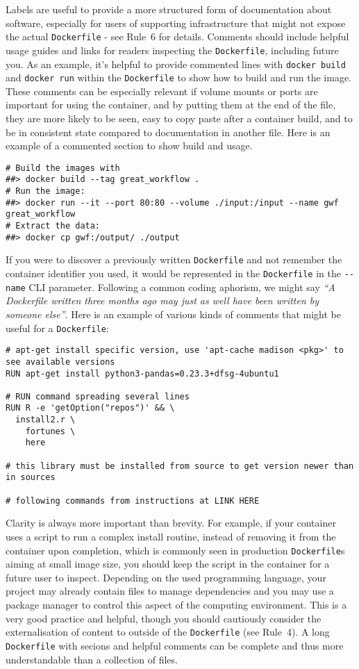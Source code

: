\documentclass[10pt,letterpaper]{article}
\begin{document}
Labels are useful to provide a more structured form of documentation
about software, especially for users of supporting infrastructure that
might not expose the actual \texttt{Dockerfile} - see Rule~6 for
details. Comments should include helpful usage guides and links for
readers inspecting the \texttt{Dockerfile}, including future you. As an
example, it's helpful to provide commented lines with
\texttt{docker\ build} and \texttt{docker\ run} within the
\texttt{Dockerfile} to show how to build and run the image. These
comments can be especially relevant if volume mounts or ports are
important for using the container, and by putting them at the end of the
file, they are more likely to be seen, easy to copy paste after a
container build, and to be in consistent state compared to documentation
in another file. Here is an example of a commented section to show build
and usage.

\begin{verbatim}
# Build the images with
##> docker build --tag great_workflow .
# Run the image:
##> docker run --it --port 80:80 --volume ./input:/input --name gwf great_workflow
# Extract the data:
##> docker cp gwf:/output/ ./output
\end{verbatim}

If you were to discover a previously written \texttt{Dockerfile} and not
remember the container identifier you used, it would be represented in
the \texttt{Dockerfile} in the \texttt{-\/-name} CLI parameter.
Following a common coding aphorism, we might say \emph{``A Dockerfile
written three months ago may just as well have been written by someone
else''}. Here is an example of various kinds of comments that might be
useful for a \texttt{Dockerfile}:

\begin{verbatim}
# apt-get install specific version, use 'apt-cache madison <pkg>' to see available versions
RUN apt-get install python3-pandas=0.23.3+dfsg-4ubuntu1

# RUN command spreading several lines
RUN R -e 'getOption("repos")' && \
  install2.r \
    fortunes \
    here

# this library must be installed from source to get version newer than in sources

# following commands from instructions at LINK HERE
\end{verbatim}

Clarity is always more important than brevity. For example, if your
container uses a script to run a complex install routine, instead of
removing it from the container upon completion, which is commonly seen
in production \texttt{Dockerfile}s aiming at small image size, you
should keep the script in the container for a future user to inspect.
Depending on the used programming language, your project may already
contain files to manage dependencies and you may use a package manager
to control this aspect of the computing environment. This is a very good
practice and helpful, though you should cautiously consider the
externalisation of content to outside of the \texttt{Dockerfile} (see
Rule~4). A long \texttt{Dockerfile} with secions and helpful comments
can be complete and thus more understandable than a collection of files.
\end{document}
